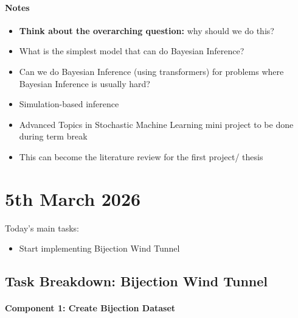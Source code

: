 \documentclass[12pt,a4paper,twoside]{article}
\begin{document}
\begin{meetingsummary}
	\paragraph{Notes}
	\begin{itemize}
		\item \textbf{Think about the overarching question:} why should we do this?
		\item What is the simplest model that can do Bayesian Inference?
		\item Can we do Bayesian Inference (using transformers) for problems where Bayesian Inference is usually hard?
		\item Simulation-based inference
		\item Advanced Topics in Stochastic Machine Learning mini project to be done during term break
		\item[$\rightarrow$] This can become the literature review for the first project/ thesis
	\end{itemize}
\end{meetingsummary}

\section{5th March 2026}

\begin{summary}
	Today's main tasks:
	\begin{itemize}[leftmargin=*]
		\item Start implementing Bijection Wind Tunnel
	\end{itemize}
\end{summary}

\subsection{Task Breakdown: Bijection Wind Tunnel}

\paragraph{Component 1: Create Bijection Dataset}
\begin{tasklist}
\end{tasklist}
\end{document}
